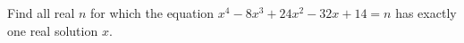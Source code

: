 Find all real $n$ for which the equation $x^4-8x^3+24x^2-32x+14=n$ has exactly one real solution $x$.
